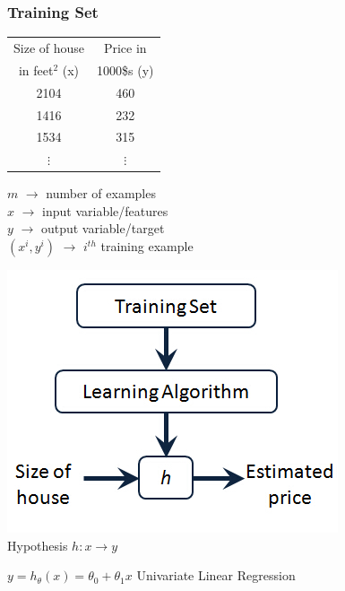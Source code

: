 \documentclass[xcolor=pdftex,dvipsnames]{beamer}
\begin{document}
\begin{frame}
  \frametitle{Training Set}
  \begin{minipage}{0.47\linewidth}
    \begin{tabular}[h]{c | c}
      Size of house   & Price in \\
      in feet$^2$ (x) & 1000\$s (y) \\\hline
      2104 & 460 \\
      1416 & 232 \\
      1534 & 315 \\
      $\vdots$ & $\vdots$
    \end{tabular}
    \begin{block}{}
      \alert{$m$} $\rightarrow$ number of examples\\
      \alert{$x$} $\rightarrow$ input variable/features\\
      \alert{$y$} $\rightarrow$ output variable/target\\
      \alert{$(x^i, y^i)$} $\rightarrow$ $i^{th}$ training example
    \end{block}
  \end{minipage} \hfill
  \pause
  \begin{minipage}{0.47\linewidth}
    \begin{center}
      \includegraphics[scale=0.55]{./fig/training_schema.png}\\ 
      Hypothesis \alert{$h: x \rightarrow y$}
    \end{center}
    \pause
    \begin{block}{}
      \begin{center}
        $y = h_{\theta}(x) = \theta_0 + \theta_1 x$
        \pause
        \alert{Univariate Linear Regression}
      \end{center}
    \end{block}
  \end{minipage}
\end{frame}
\end{document}
